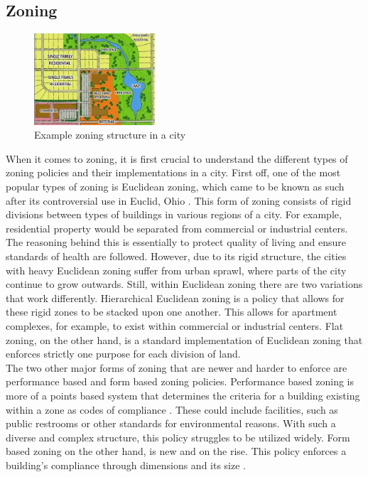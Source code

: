 \documentclass[11pt]{article}
\begin{document}
\begin{multicols}{2}
    \subsection{Zoning} \label{zoning}
    
    \begin{figure}[H]
        \centering
        \includegraphics[width=0.4\textwidth]{images/zoning.png}
        \caption{Example zoning structure in a city \cite{zoningdiagram}}
        \label{fig:zoningdiagram}
    \end{figure}
    
    \quad When it comes to zoning, it is first crucial to understand the different types of zoning policies and their implementations in a city. First off, one of the most popular types of zoning is Euclidean zoning, which came to be known as such after its controversial use in Euclid, Ohio \cite{zoning}. This form of zoning consists of rigid divisions between types of buildings in various regions of a city. For example, residential property would be separated from commercial or industrial centers. The reasoning behind this is essentially to protect quality of living and ensure standards of health are followed. However, due to its rigid structure, the cities with heavy Euclidean zoning suffer from urban sprawl, where parts of the city continue to grow outwards. Still, within Euclidean zoning there are two variations that work differently. Hierarchical Euclidean zoning is a policy that allows for these rigid zones to be stacked upon one another. This allows for apartment complexes, for example, to exist within commercial or industrial centers. Flat zoning, on the other hand, is a standard implementation of Euclidean zoning that enforces strictly one purpose for each division of land.\\
    
    \quad The two other major forms of zoning that are newer and harder to enforce are performance based and form based zoning policies. Performance based zoning is more of a points based system that determines the criteria for a building existing within a zone as codes of compliance \cite{zoning}. These could include facilities, such as public restrooms or other standards for environmental reasons. With such a diverse and complex structure, this policy struggles to be utilized widely. Form based zoning on the other hand, is new and on the rise. This policy enforces a building's compliance through dimensions and its size \cite{zoning}. \\


\end{multicols}
\end{document}

